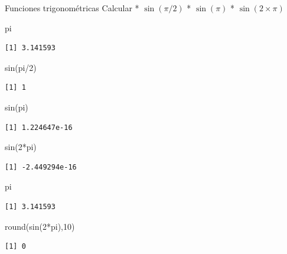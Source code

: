 \documentclass[
  ignorenonframetext,
  aspectratio=169,
  spanish,
]{beamer}
\newenvironment{Shaded}{\begin{snugshade}}{\end{snugshade}}
\newcommand{\DecValTok}[1]{\textcolor[rgb]{0.68,0.00,0.00}{#1}}
\newcommand{\FunctionTok}[1]{\textcolor[rgb]{0.28,0.35,0.67}{#1}}
\newcommand{\NormalTok}[1]{\textcolor[rgb]{0.00,0.23,0.31}{#1}}
\newcommand{\SpecialCharTok}[1]{\textcolor[rgb]{0.37,0.37,0.37}{#1}}
\begin{document}
\begin{frame}[fragile]{Funciones trigonométricas}
\label{funciones-trigonomuxe9tricas}
Calcular * \(\sin(\pi/2)\) * \(\sin(\pi)\) * \(\sin(2\times \pi)\)

\begin{Shaded}
\begin{Highlighting}[]
\NormalTok{pi}
\end{Highlighting}
\end{Shaded}

\begin{verbatim}
[1] 3.141593
\end{verbatim}

\begin{Shaded}
\begin{Highlighting}[]
\FunctionTok{sin}\NormalTok{(pi}\SpecialCharTok{/}\DecValTok{2}\NormalTok{)}
\end{Highlighting}
\end{Shaded}

\begin{verbatim}
[1] 1
\end{verbatim}

\begin{Shaded}
\begin{Highlighting}[]
\FunctionTok{sin}\NormalTok{(pi)}
\end{Highlighting}
\end{Shaded}

\begin{verbatim}
[1] 1.224647e-16
\end{verbatim}

\begin{Shaded}
\begin{Highlighting}[]
\FunctionTok{sin}\NormalTok{(}\DecValTok{2}\SpecialCharTok{*}\NormalTok{pi)}
\end{Highlighting}
\end{Shaded}

\begin{verbatim}
[1] -2.449294e-16
\end{verbatim}

\begin{Shaded}
\begin{Highlighting}[]
\NormalTok{pi}
\end{Highlighting}
\end{Shaded}

\begin{verbatim}
[1] 3.141593
\end{verbatim}

\begin{Shaded}
\begin{Highlighting}[]
\FunctionTok{round}\NormalTok{(}\FunctionTok{sin}\NormalTok{(}\DecValTok{2}\SpecialCharTok{*}\NormalTok{pi),}\DecValTok{10}\NormalTok{)}
\end{Highlighting}
\end{Shaded}

\begin{verbatim}
[1] 0
\end{verbatim}
\end{frame}
\end{document}
